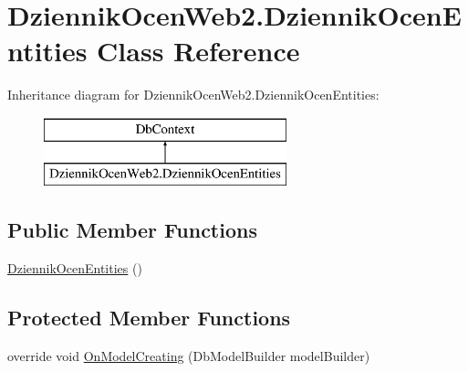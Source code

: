 \hypertarget{class_dziennik_ocen_web2_1_1_dziennik_ocen_entities}{}\section{Dziennik\+Ocen\+Web2.\+Dziennik\+Ocen\+Entities Class Reference}
\label{class_dziennik_ocen_web2_1_1_dziennik_ocen_entities}
Inheritance diagram for Dziennik\+Ocen\+Web2.\+Dziennik\+Ocen\+Entities\+:\begin{figure}[H]
\begin{center}
\leavevmode
\includegraphics[height=2.000000cm]{class_dziennik_ocen_web2_1_1_dziennik_ocen_entities}
\end{center}
\end{figure}
\subsection*{Public Member Functions}
\begin{DoxyCompactItemize}
\item 
\hyperlink{class_dziennik_ocen_web2_1_1_dziennik_ocen_entities_a5fd581ca9a221a465221ee4b10229dc5}{Dziennik\+Ocen\+Entities} ()
\end{DoxyCompactItemize}
\subsection*{Protected Member Functions}
\begin{DoxyCompactItemize}
\item 
override void \hyperlink{class_dziennik_ocen_web2_1_1_dziennik_ocen_entities_a39a77c5c71b076abfb757275c435ddd5}{On\+Model\+Creating} (Db\+Model\+Builder model\+Builder)
\end{DoxyCompactItemize}
